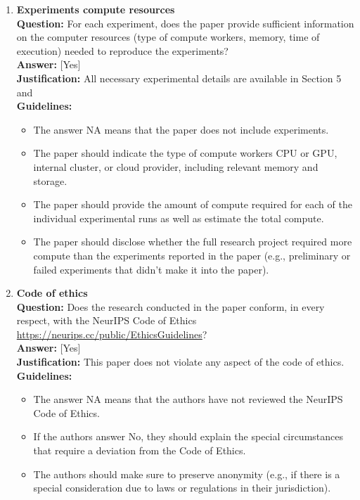 \begin{enumerate}
\item \textbf{Experiments compute resources}\\
\textbf{Question:} For each experiment, does the paper provide sufficient information on the computer resources (type of compute workers, memory, time of execution) needed to reproduce the experiments?\\
\textbf{Answer:} [Yes]\\
\textbf{Justification:} All necessary experimental details are available in Section 5 and\\
\textbf{Guidelines:}
\begin{itemize}
\item The answer NA means that the paper does not include experiments.
\item The paper should indicate the type of compute workers CPU or GPU, internal cluster, or cloud provider, including relevant memory and storage.
\item The paper should provide the amount of compute required for each of the individual experimental runs as well as estimate the total compute.
\item The paper should disclose whether the full research project required more compute than the experiments reported in the paper (e.g., preliminary or failed experiments that didn't make it into the paper).
\end{itemize}

\item \textbf{Code of ethics}\\
\textbf{Question:} Does the research conducted in the paper conform, in every respect, with the NeurIPS Code of Ethics \url{https://neurips.cc/public/EthicsGuidelines}?\\
\textbf{Answer:} [Yes]\\
\textbf{Justification:} This paper does not violate any aspect of the code of ethics.\\
\textbf{Guidelines:}
\begin{itemize}
\item The answer NA means that the authors have not reviewed the NeurIPS Code of Ethics.
\item If the authors answer No, they should explain the special circumstances that require a deviation from the Code of Ethics.
\item The authors should make sure to preserve anonymity (e.g., if there is a special consideration due to laws or regulations in their jurisdiction).
\end{itemize}


\end{enumerate}
